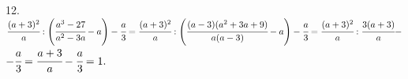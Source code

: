 12. $\cfrac{(a+3)^2}{a}:\left(\cfrac{a^3-27}{a^2-3a}-a\right)-\cfrac{a}{3}=
\cfrac{(a+3)^2}{a}:\left(\cfrac{(a-3)(a^2+3a+9)}{a(a-3)}-a\right)-\cfrac{a}{3}=
\cfrac{(a+3)^2}{a}:\cfrac{3(a+3)}{a}-$\\$-\cfrac{a}{3}=\cfrac{a+3}{a}-\cfrac{a}{3}=1.$\\
